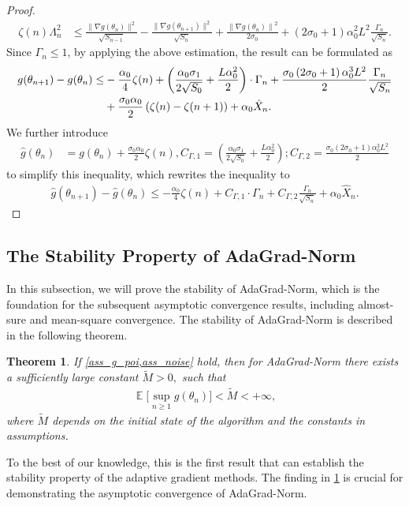 \documentclass[standalone]{article}
\newtheorem{thm}{Theorem}[section]
\DeclareMathOperator{\Expect}{\mathbb{E}}
\begin{document}
\begin{proof}
\begin{align*}
\zeta(n) \Lambda_n^2 & \leq  \frac{\|\nabla g(\theta_{n})\|^{2}}{\sqrt{S_{n-1}}}-\frac{\|\nabla g(\theta_{n+1})\|^{2}}{\sqrt{S_{n}}} + \frac{\left\| \nabla g(\theta_{n})\right\|^2}{2\sigma_0} + \left( 2\sigma_0 + 1\right)\alpha_{0}^{2} L^{2}\frac{\Gamma_{n}}{\sqrt{S_{n}}}.
\end{align*}
Since $\Gamma_n \leq 1$, by applying the above estimation, the result can be formulated as
\begin{align*}
g(\theta_{n+1})-g(\theta_{n})  \le & -\frac{\alpha_{0}}{4}\zeta(n)+\left(\frac{\alpha_{0}\sigma_{1}}{2\sqrt{S_{0}}}  + \frac{ L\alpha_{0}^{2}}{2}\right)\cdot \Gamma_n  + \frac{\sigma_{0}\left( 2\sigma_0 + 1\right)\alpha_{0}^{3} L^{2}}{2}\frac{\Gamma_{n}}{\sqrt{S_{n}}} \notag \\
&+ \frac{\sigma_{0}\alpha_{0}}{2}\left(\zeta(n) - \zeta(n+1) \right) + \alpha_0 \hat{X}_{n}.
\end{align*}
We further introduce 
\begin{align}\label{notation:ghat:const}
\hat{g}(\theta_n) & = g(\theta_{n}) + \frac{\sigma_{0}\alpha_{0}}{2}\zeta(n), C_{\Gamma,1} = \left(\frac{\alpha_{0}\sigma_{1}}{2\sqrt{S_{0}}}  + \frac{ L\alpha_{0}^{2}}{2}\right);
C_{\Gamma,2}  = \frac{\sigma_{0}\left( 2\sigma_0 + 1\right)\alpha_{0}^{3} L^{2}}{2}
\end{align} to simplify this inequality, which rewrites the inequality to
\begin{align*}
\hat{g}(\theta_{n+1}) - \hat{g}(\theta_n) \leq -\frac{\alpha_{0}}{4}\zeta(n)+C_{\Gamma, 1}\cdot \Gamma_n  + C_{\Gamma, 2}\frac{\Gamma_n}{\sqrt{S_{n}}} + \alpha_0 \hat{X}_{n}.
\end{align*}
\end{proof}




\subsection{The Stability Property of AdaGrad-Norm}\label{subsec:stability}
In this subsection, we will prove the stability of AdaGrad-Norm, which is the foundation for the subsequent asymptotic convergence results, including almost-sure and mean-square convergence. The stability of AdaGrad-Norm is described in the following theorem.
\begin{thm}\label{stable}
If \cref{ass_g_poi,ass_noise} hold, then for AdaGrad-Norm there exists a sufficiently large constant $\tilde{M}>0,$ such that
\begin{equation}\nonumber\begin{aligned}
\Expect\Big[\sup_{n\ge 1}g(\theta_{n})\Big]< \tilde{M}<+\infty,
\end{aligned}\end{equation}
where $\tilde{M}$  depends on the initial state of the algorithm and the constants in assumptions.
\end{thm}
To the best of our knowledge, this is the first result that can establish the stability property of the adaptive gradient methods. The finding in \cref{stable} is crucial for demonstrating the asymptotic convergence of AdaGrad-Norm. 
\end{document}
